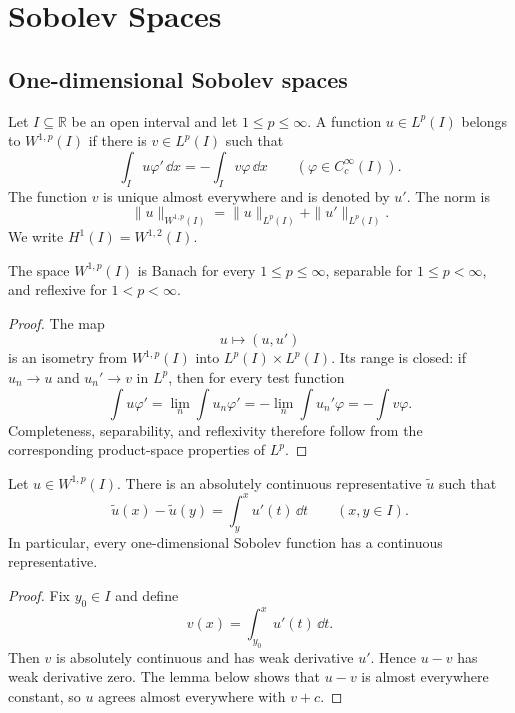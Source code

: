 \chapter{Sobolev Spaces}

\section{One-dimensional Sobolev spaces}

\begin{notedefinition}
Let $I\subseteq\mathbb R$ be an open interval and let $1\le p\le\infty$.  A
function $u\in L^p(I)$ belongs to $W^{1,p}(I)$ if there is $v\in L^p(I)$ such
that
\[
  \int_I u\varphi'\,\dd x
  =-\int_I v\varphi\,\dd x
  \qquad(\varphi\in C_c^\infty(I)).
\]
The function $v$ is unique almost everywhere and is denoted by $u'$.  The norm
is
\[
  \|u\|_{W^{1,p}(I)}=\|u\|_{L^p(I)}+\|u'\|_{L^p(I)}.
\]
We write $H^1(I)=W^{1,2}(I)$.
\end{notedefinition}

\begin{notetheorem}
The space $W^{1,p}(I)$ is Banach for every $1\le p\le\infty$, separable for
$1\le p<\infty$, and reflexive for $1<p<\infty$.
\end{notetheorem}

\begin{proof}
The map
\[
  u\longmapsto(u,u')
\]
is an isometry from $W^{1,p}(I)$ into $L^p(I)\times L^p(I)$.  Its range is
closed: if $u_n\to u$ and $u_n'\to v$ in $L^p$, then for every test function
\[
  \int u\varphi'
  =\lim_n\int u_n\varphi'
  =-\lim_n\int u_n'\varphi
  =-\int v\varphi.
\]
Completeness, separability, and reflexivity therefore follow from the
corresponding product-space properties of $L^p$.
\end{proof}

\begin{notetheorem}
Let $u\in W^{1,p}(I)$.  There is an absolutely continuous representative
$\widetilde u$ such that
\[
  \widetilde u(x)-\widetilde u(y)
  =\int_y^x u'(t)\,\dd t
  \qquad(x,y\in I).
\]
In particular, every one-dimensional Sobolev function has a continuous
representative.
\end{notetheorem}

\begin{proof}
Fix $y_0\in I$ and define
\[
  v(x)=\int_{y_0}^x u'(t)\,\dd t.
\]
Then $v$ is absolutely continuous and has weak derivative $u'$.  Hence
$u-v$ has weak derivative zero.  The lemma below shows that $u-v$ is almost
everywhere constant, so $u$ agrees almost everywhere with $v+c$.
\end{proof}

